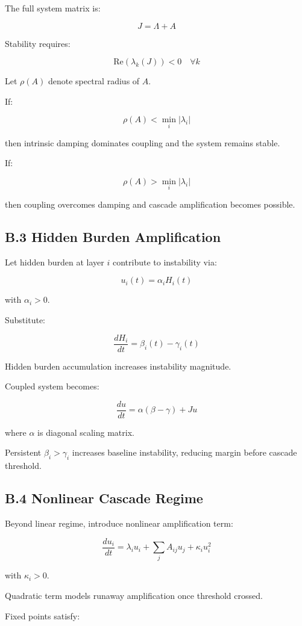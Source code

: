 \documentclass[11pt,openany]{book}
\begin{document}
The full system matrix is:

\[
J = \Lambda + A
\]

Stability requires:

\[
\mathrm{Re}(\lambda_k(J)) < 0 \quad \forall k
\]

Let $\rho(A)$ denote spectral radius of $A$.

If:

\[
\rho(A) < \min_i |\lambda_i|
\]

then intrinsic damping dominates coupling and the system remains stable.

If:

\[
\rho(A) > \min_i |\lambda_i|
\]

then coupling overcomes damping and cascade amplification becomes possible.

\subsection{B.3 Hidden Burden Amplification}

Let hidden burden at layer $i$ contribute to instability via:

\[
u_i(t) = \alpha_i H_i(t)
\]

with $\alpha_i > 0$.

Substitute:

\[
\frac{dH_i}{dt} = \beta_i(t) - \gamma_i(t)
\]

Hidden burden accumulation increases instability magnitude.

Coupled system becomes:

\[
\frac{du}{dt}
=
\alpha (\beta - \gamma) + J u
\]

where $\alpha$ is diagonal scaling matrix.

Persistent $\beta_i > \gamma_i$ increases baseline instability, 
reducing margin before cascade threshold.

\subsection{B.4 Nonlinear Cascade Regime}

Beyond linear regime, introduce nonlinear amplification term:

\[
\frac{du_i}{dt}
=
\lambda_i u_i
+
\sum_j A_{ij} u_j
+
\kappa_i u_i^2
\]

with $\kappa_i > 0$.

Quadratic term models runaway amplification once threshold crossed.

Fixed points satisfy:
\end{document}
